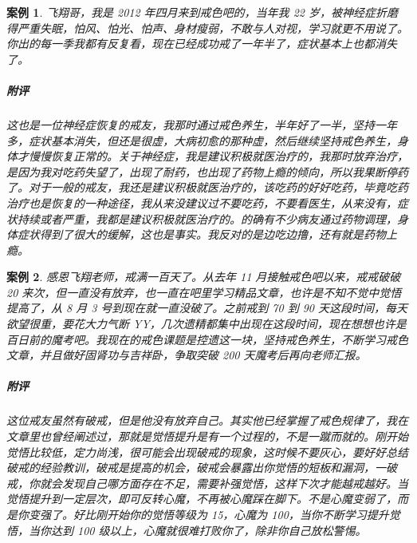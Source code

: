 \documentclass{ctexart}
\newtheorem{case}{案例}
\begin{document}
\begin{case}
    飞翔哥，我是 2012 年四月来到戒色吧的，当年我 22 岁，被神经症折磨得严重失眠，怕风、怕光、怕声、身材瘦弱，不敢与人对视，学习就更不用说了。你出的每一季我都有反复看，现在已经成功戒了一年半了，症状基本上也都消失了。
    \subparagraph{附评} 这也是一位神经症恢复的戒友，我那时通过戒色养生，半年好了一半，坚持一年多，症状基本消失，但还是很虚，大病初愈的那种虚，然后继续坚持戒色养生，身体才慢慢恢复正常的。关于神经症，我是建议积极就医治疗的，我那时放弃治疗，是因为我对吃药失望了，出现了耐药，也出现了药物上瘾的倾向，所以我果断停药了。对于一般的戒友，我还是建议积极就医治疗的，该吃药的好好吃药，毕竟吃药治疗也是恢复的一种途径，我从来没建议过不要吃药，不要看医生，从来没有，症状持续或者严重，我都是建议积极就医治疗的。的确有不少病友通过药物调理，身体症状得到了很大的缓解，这也是事实。我反对的是边吃边撸，还有就是药物上瘾。
\end{case}

\begin{case}
    感恩飞翔老师，戒满一百天了。从去年 11 月接触戒色吧以来，戒戒破破 20 来次，但一直没有放弃，也一直在吧里学习精品文章，也许是不知不觉中觉悟提高了，从 8 月 3 号到现在就一直没破了。之前戒到 70 到 90 天这段时间，每天欲望很重，要花大力气断 YY，几次遗精都集中出现在这段时间，现在想想也许是百日前的魔考吧。我现在的戒色课题是控遗这一块，坚持戒色养生，不断学习戒色文章，并且做好固肾功与吉祥卧，争取突破 200 天魔考后再向老师汇报。
    \subparagraph{附评} 这位戒友虽然有破戒，但是他没有放弃自己。其实他已经掌握了戒色规律了，我在文章里也曾经阐述过，那就是觉悟提升是有一个过程的，不是一蹴而就的。刚开始觉悟比较低，定力尚浅，很可能会出现破戒的现象，这时候不要灰心，要好好总结破戒的经验教训，破戒是提高的机会，破戒会暴露出你觉悟的短板和漏洞，一破戒，你就会发现自己哪方面存在不足，需要补强觉悟，这样下次才能越戒越好。当觉悟提升到一定层次，即可反转心魔，不再被心魔踩在脚下。不是心魔变弱了，而是你变强了。好比刚开始你的觉悟等级为 15，心魔为 100，当你不断学习提升觉悟，当你达到 100 级以上，心魔就很难打败你了，除非你自己放松警惕。
\end{case}
\end{document}
